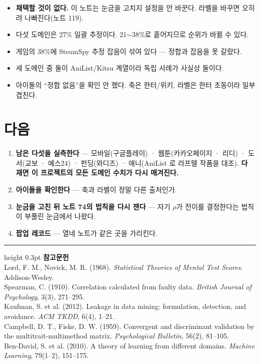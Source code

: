 \documentclass[10pt]{article}
\begin{document}
\begin{itemize}[leftmargin=1.1em,itemsep=0.15em]
\item \textbf{채택할 것이 없다.} 이 노트는 눈금을 고치지 설정을 안 바꾼다.
      라벨을 바꾸면 오히려 나빠진다(노트 119).
\item 다섯 도메인은 27\% 일괄 추정이다. 21$\sim$38\%로 흩어지므로 순위가
      바뀔 수 있다.
\item 게임의 38\%에 SteamSpy 추정 잡음이 섞여 있다 --- 정합과 잡음을 못 갈랐다.
\item 세 도메인 중 둘이 AniList/Kitsu 계열이라 독립 사례가 사실상 둘이다.
\item 아이돌의 ``정합 없음''을 확인 안 했다. 축은 한터/위키, 라벨은 한터
      초동이라 일부 겹친다.
\end{itemize}

\section{다음}

\begin{enumerate}[leftmargin=1.3em,itemsep=0.15em]
\item \textbf{남은 다섯을 실측한다} --- 모바일(구글플레이) · 웹툰(카카오페이지 ·
      리디) · 도서(교보 · 예스24) · 펀딩(와디즈) · 애니(AniList 로 라프텔
      작품을 대조). \textbf{다 재면 이 프로젝트의 모든 도메인 수치가 다시
      매겨진다.}
\item \textbf{아이돌을 확인한다} --- 축과 라벨이 정말 다른 출처인가.
\item \textbf{눈금을 고친 뒤 노트 74의 법칙을 다시 잰다} --- 자기 $\rho$가
      전이를 결정한다는 법칙이 부풀린 눈금에서 나왔다.
\item \textbf{팝업 레코드} --- 열네 노트가 같은 곳을 가리킨다.
\end{enumerate}

\vspace{0.6em}
\hrule height 0.3pt
\vspace{0.5em}
{\footnotesize
\textbf{참고문헌}\\[0.3em]
Lord, F. M., Novick, M. R. (1968). \emph{Statistical Theories of Mental Test
Scores}. Addison-Wesley.\\[0.15em]
Spearman, C. (1910). Correlation calculated from faulty data.
\emph{British Journal of Psychology}, 3(3), 271--295.\\[0.15em]
Kaufman, S. et al. (2012). Leakage in data mining: formulation, detection, and
avoidance. \emph{ACM TKDD}, 6(4), 1--21.\\[0.15em]
Campbell, D. T., Fiske, D. W. (1959). Convergent and discriminant validation by
the multitrait-multimethod matrix. \emph{Psychological Bulletin}, 56(2), 81--105.\\[0.15em]
Ben-David, S. et al. (2010). A theory of learning from different domains.
\emph{Machine Learning}, 79(1--2), 151--175.
}
\end{document}

